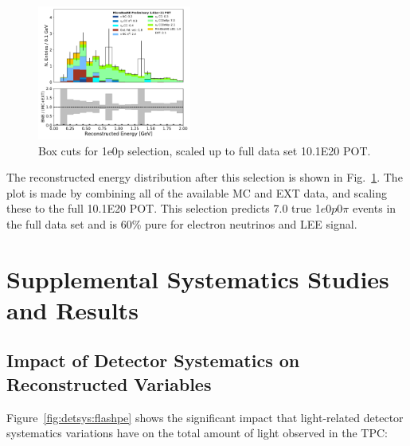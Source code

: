 \documentclass[a4paper]{article}
\newcommand{\zpsel}{1$e$0$p$0$\pi$\xspace}
\begin{document}
\begin{figure}[H]
\begin{center}
\includegraphics[width=0.45\textwidth]{1e0p/run123/reco_e_BoxCut_R1R2R3.pdf}
\caption{\label{fig:1e0p:cutbased:RUN3} Box cuts for 1e0p selection, scaled up to full data set 10.1E20 POT.}
\end{center}
\end{figure}

The reconstructed energy distribution after this selection is shown in Fig.~\ref{fig:1e0p:cutbased:RUN3}.  The plot is made by combining all of the available MC and EXT data, and scaling these to the full 10.1E20 POT.  This selection predicts 7.0 true \zpsel events in the full data set and is 60\% pure for electron neutrinos and LEE signal.


\section{Supplemental Systematics Studies and Results}
\label{app:detsys}

\subsection{Impact of Detector Systematics on Reconstructed Variables}
\label{app:detsys:impact}
Figure~\ref{fig:detsys:flashpe} shows the significant impact that light-related detector systematics variations have on the total amount of light observed in the TPC:
\end{document}
